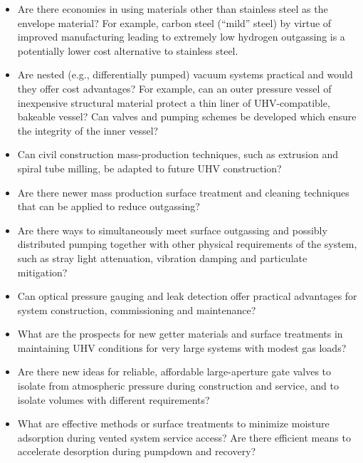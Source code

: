 \begin{itemize}
\item  Are there economies in using materials other than stainless steel as the envelope material? %
For example, carbon steel (``mild'' steel) by virtue of improved manufacturing leading to extremely low hydrogen outgassing is a potentially lower cost alternative to 
stainless steel. 

\item Are nested (e.g., differentially pumped) vacuum systems practical and would they offer cost advantages? For example, can an outer pressure vessel of inexpensive structural material protect a thin liner of UHV-compatible, bakeable vessel?  Can valves and pumping schemes be developed which ensure the integrity of the inner vessel?

\item Can civil construction mass-production techniques, such as extrusion and spiral tube milling, be adapted to future UHV construction?

\item Are there newer mass production surface treatment and cleaning techniques that can be applied to reduce outgassing? %

\item Are there ways to simultaneously meet surface outgassing and possibly distributed pumping together with other physical requirements of the system, such as 
stray light attenuation, vibration damping and particulate mitigation?

\item Can optical pressure gauging and leak detection offer practical advantages for system construction, commissioning and maintenance?

\item What are the prospects for new getter materials and surface treatments in maintaining UHV conditions for very large systems with modest gas loads?

\item Are there new ideas for reliable, affordable large-aperture gate valves to isolate from atmospheric pressure during construction and service, and to isolate volumes with different requirements?

\item What are effective methods or surface treatments to minimize moisture adsorption during vented system service access? Are there efficient means to accelerate desorption during pumpdown and recovery?

\end{itemize}

